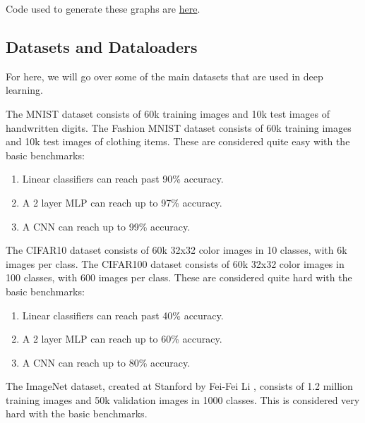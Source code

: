 \documentclass{article}
\begin{document}
    \begin{code} 
      Code used to generate these graphs are \href{code/activation_functions.ipynb}{here}.
    \end{code} 

  \subsection{Datasets and Dataloaders} 

    For here, we will go over some of the main datasets that are used in deep learning. 

    \begin{definition}
      The MNIST dataset consists of 60k training images and 10k test images of handwritten digits. The Fashion MNIST dataset consists of 60k training images and 10k test images of clothing items. These are considered quite easy with the basic benchmarks: 
      \begin{enumerate} 
        \item Linear classifiers can reach past 90\% accuracy. 
        \item A 2 layer MLP can reach up to 97\% accuracy. 
        \item A CNN can reach up to 99\% accuracy. 
      \end{enumerate}
    \end{definition}

    \begin{definition}
      The CIFAR10 dataset consists of 60k 32x32 color images in 10 classes, with 6k images per class. The CIFAR100 dataset consists of 60k 32x32 color images in 100 classes, with 600 images per class. These are considered quite hard with the basic benchmarks: 
      \begin{enumerate} 
        \item Linear classifiers can reach past 40\% accuracy. 
        \item A 2 layer MLP can reach up to 60\% accuracy. 
        \item A CNN can reach up to 80\% accuracy. 
      \end{enumerate}
    \end{definition}

    \begin{definition}[ImageNet]
      The ImageNet dataset, created at Stanford by Fei-Fei Li \cite{ImageNet}, consists of 1.2 million training images and 50k validation images in 1000 classes. This is considered very hard with the basic benchmarks. 
    \end{definition}
\end{document}
